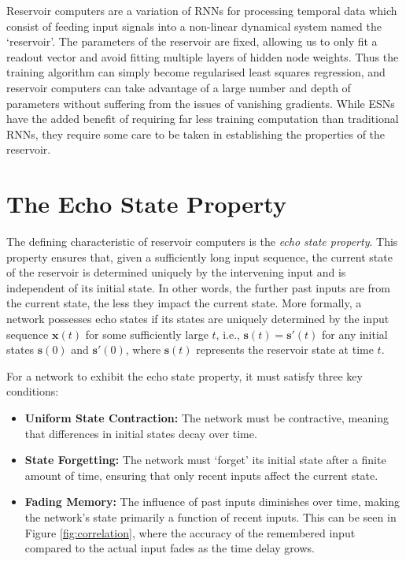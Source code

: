 \documentclass[a4paper,12pt]{article}
\begin{document}
Reservoir computers are a variation of RNNs for processing temporal data which consist of feeding input signals into a non-linear dynamical system named the `reservoir'. The parameters of the reservoir are fixed, allowing us to only fit a readout vector and avoid fitting multiple layers of hidden node weights. Thus the training algorithm can simply become regularised least squares regression, and reservoir computers can take advantage of a large number and depth of parameters without suffering from the issues of vanishing gradients. While ESNs have the added benefit of requiring far less training computation than traditional RNNs, they require some care to be taken in establishing the properties of the reservoir.



\section*{The Echo State Property}

The defining characteristic of reservoir computers is the \textit{echo state property}. This property ensures that, given a sufficiently long input sequence, the current state of the reservoir is determined uniquely by the intervening input and is independent of its initial state\cite{jaeger2001echo}. In other words, the further past inputs are from the current state, the less they impact the current state. More formally, a network possesses echo states if its states are uniquely determined by the input sequence $\mathbf{x}(t)$ for some sufficiently large $t$, i.e., $\mathbf{s}(t) = \mathbf{s}'(t)$ for any initial states $\mathbf{s}(0)$ and $\mathbf{s}'(0)$, where $\mathbf{s}(t)$ represents the reservoir state at time $t$.


For a network to exhibit the echo state property, it must satisfy three key conditions:
\begin{itemize}
    \item \textbf{Uniform State Contraction:} The network must be contractive, meaning that differences in initial states decay over time.
    \item \textbf{State Forgetting:} The network must `forget' its initial state after a finite amount of time, ensuring that only recent inputs affect the current state.
    \item \textbf{Fading Memory:} The influence of past inputs diminishes over time, making the network's state primarily a function of recent inputs. This can be seen in Figure \ref{fig:correlation}, where the accuracy of the remembered input compared to the actual input fades as the time delay grows.
\end{itemize}
\end{document}
